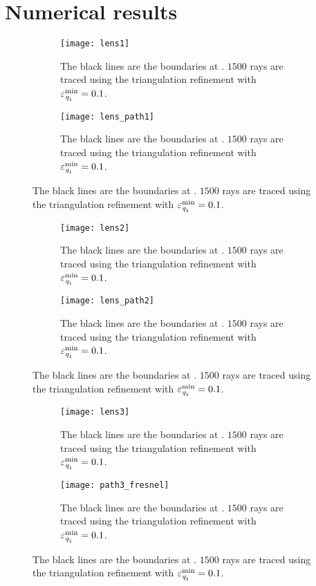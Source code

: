 \section{Numerical results}
\begin{figure}[h!]
\centering
\begin{subfigure}{.45\textwidth}
  \texttt{[image: lens1]}
 \caption{The black lines are the boundaries at . $1500$ rays are traced using the triangulation refinement with $\varepsilon_{\textit{q}_1}^{\textrm{min}}=0.1$. }
  \label{fig:boundaries_s2}
\end{subfigure}%
\hfill
\begin{subfigure}{.45\textwidth}
  \texttt{[image: lens\_path1]}
  \caption{The black lines are the boundaries at . $1500$ rays are traced using the triangulation refinement with $\varepsilon_{\textit{q}_1}^{\textrm{min}}=0.1$.} %
  \label{fig:boundaries_t2}
\end{subfigure} %
\end{figure}
\begin{figure}[h!]
\centering
\begin{subfigure}{.45\textwidth}
  \texttt{[image: lens2]}
 \caption{The black lines are the boundaries at . $1500$ rays are traced using the triangulation refinement with $\varepsilon_{\textit{q}_1}^{\textrm{min}}=0.1$. }
  \label{fig:boundaries_s2}
\end{subfigure}%
\hfill
\begin{subfigure}{.45\textwidth}
  \texttt{[image: lens\_path2]}
  \caption{The black lines are the boundaries at . $1500$ rays are traced using the triangulation refinement with $\varepsilon_{\textit{q}_1}^{\textrm{min}}=0.1$.} %
  \label{fig:boundaries_t2}
\end{subfigure} %
\end{figure}
\begin{figure}[h!]
\centering
\begin{subfigure}{.45\textwidth}
  \texttt{[image: lens3]}
 \caption{The black lines are the boundaries at . $1500$ rays are traced using the triangulation refinement with $\varepsilon_{\textit{q}_1}^{\textrm{min}}=0.1$. }
  \label{fig:boundaries_s2}
\end{subfigure}%
\hfill
\begin{subfigure}{.45\textwidth}
  \texttt{[image: path3\_fresnel]}
  \caption{The black lines are the boundaries at . $1500$ rays are traced using the triangulation refinement with $\varepsilon_{\textit{q}_1}^{\textrm{min}}=0.1$.} %
  \label{fig:boundaries_t2}
\end{subfigure} %
\end{figure}
